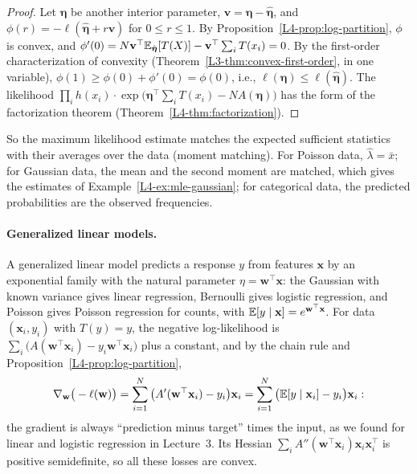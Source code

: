\begin{proof}
    Let $\boldsymbol{\eta}$ be another interior parameter, $\mathbf{v} = \boldsymbol{\eta} - \hat{\boldsymbol{\eta}}$, and $\phi(r) = -\ell(\hat{\boldsymbol{\eta}} + r\mathbf{v})$ for $0 \leq r \leq 1$. By Proposition~\ref{L4-prop:log-partition}, $\phi$ is convex, and $\phi'(0) = N\mathbf{v}^\top\mathbb{E}_{\hat{\boldsymbol{\eta}}}[T(X)] - \mathbf{v}^\top\sum_i T(x_i) = 0$. By the first-order characterization of convexity (Theorem~\ref{L3-thm:convex-first-order}, in one variable), $\phi(1) \geq \phi(0) + \phi'(0) = \phi(0)$, i.e., $\ell(\boldsymbol{\eta}) \leq \ell(\hat{\boldsymbol{\eta}})$. The likelihood $\prod_i h(x_i) \cdot \exp\big(\boldsymbol{\eta}^\top\sum_i T(x_i) - NA(\boldsymbol{\eta})\big)$ has the form of the factorization theorem (Theorem~\ref{L4-thm:factorization}).
\end{proof}

So the maximum likelihood estimate matches the expected sufficient statistics with their averages over the data (moment matching). For Poisson data, $\hat\lambda = \bar x$; for Gaussian data, the mean and the second moment are matched, which gives the estimates of Example~\ref{L4-ex:mle-gaussian}; for categorical data, the predicted probabilities are the observed frequencies.

\paragraph{Generalized linear models.} A generalized linear model predicts a response $y$ from features $\mathbf{x}$ by an exponential family with the natural parameter $\eta = \mathbf{w}^\top\mathbf{x}$: the Gaussian with known variance gives linear regression, Bernoulli gives logistic regression, and Poisson gives Poisson regression for counts, with $\mathbb{E}[y \mid \mathbf{x}] = e^{\mathbf{w}^\top\mathbf{x}}$. For data $(\mathbf{x}_i, y_i)$ with $T(y) = y$, the negative log-likelihood is $\sum_i \big(A(\mathbf{w}^\top\mathbf{x}_i) - y_i\mathbf{w}^\top\mathbf{x}_i\big)$ plus a constant, and by the chain rule and Proposition~\ref{L4-prop:log-partition},
\[\nabla_{\mathbf{w}}\big(-\ell(\mathbf{w})\big) = \sum_{i=1}^N \big(A'(\mathbf{w}^\top\mathbf{x}_i) - y_i\big)\mathbf{x}_i = \sum_{i=1}^N \big(\mathbb{E}[y \mid \mathbf{x}_i] - y_i\big)\mathbf{x}_i:\]
the gradient is always ``prediction minus target'' times the input, as we found for linear and logistic regression in Lecture~3. Its Hessian $\sum_i A''(\mathbf{w}^\top\mathbf{x}_i)\mathbf{x}_i\mathbf{x}_i^\top$ is positive semidefinite, so all these losses are convex.

